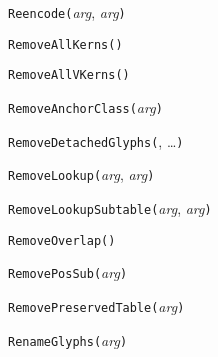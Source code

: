 
\texttt{Reencode(}\textit{arg}, \textit{arg}\texttt{)}



\texttt{RemoveAllKerns(}\texttt{)}



\texttt{RemoveAllVKerns(}\texttt{)}



\texttt{RemoveAnchorClass(}\textit{arg}\texttt{)}



\texttt{RemoveDetachedGlyphs(}, \ldots\texttt{)}



\texttt{RemoveLookup(}\textit{arg}, \textit{arg}\texttt{)}



\texttt{RemoveLookupSubtable(}\textit{arg}, \textit{arg}\texttt{)}



\texttt{RemoveOverlap(}\texttt{)}



\texttt{RemovePosSub(}\textit{arg}\texttt{)}



\texttt{RemovePreservedTable(}\textit{arg}\texttt{)}



\texttt{RenameGlyphs(}\textit{arg}\texttt{)}



